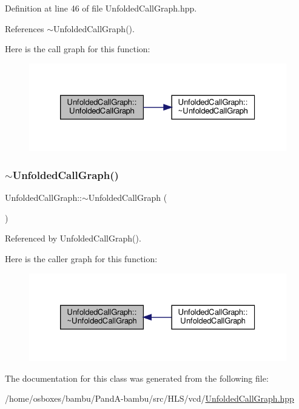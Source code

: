 Definition at line 46 of file Unfolded\+Call\+Graph.\+hpp.



References $\sim$\+Unfolded\+Call\+Graph().

Here is the call graph for this function\+:
\nopagebreak
\begin{figure}[H]
\begin{center}
\leavevmode
\includegraphics[width=326pt]{dd/d99/classUnfoldedCallGraph_a20bf436ff102966d0ec593f24834aeef_cgraph}
\end{center}
\end{figure}
\mbox{\label{classUnfoldedCallGraph_a072951a37bb5d49a26e2b9a32a1bcec3}} 
\subsubsection{\texorpdfstring{$\sim$\+Unfolded\+Call\+Graph()}{~UnfoldedCallGraph()}}
{\footnotesize\ttfamily Unfolded\+Call\+Graph\+::$\sim$\+Unfolded\+Call\+Graph (\begin{DoxyParamCaption}{ }\end{DoxyParamCaption})\hspace{0.3cm}{\ttfamily [default]}}



Referenced by Unfolded\+Call\+Graph().

Here is the caller graph for this function\+:
\nopagebreak
\begin{figure}[H]
\begin{center}
\leavevmode
\includegraphics[width=326pt]{dd/d99/classUnfoldedCallGraph_a072951a37bb5d49a26e2b9a32a1bcec3_icgraph}
\end{center}
\end{figure}


The documentation for this class was generated from the following file\+:\begin{DoxyCompactItemize}
\item 
/home/osboxes/bambu/\+Pand\+A-\/bambu/src/\+H\+L\+S/vcd/\hyperlink{UnfoldedCallGraph_8hpp}{Unfolded\+Call\+Graph.\+hpp}\end{DoxyCompactItemize}
